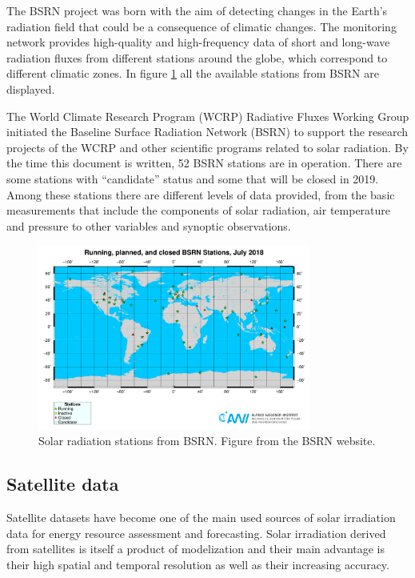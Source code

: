 
The BSRN project was born with the aim of detecting changes in the Earth's radiation field that could be a consequence of climatic changes. The monitoring network provides high-quality and high-frequency data of short and long-wave radiation fluxes from different stations around the globe, which correspond to different climatic zones. In figure \ref{fig:bsrnstations} all the available stations from BSRN are displayed.

The World Climate Research Program (WCRP) Radiative Fluxes Working Group initiated the Baseline Surface Radiation Network (BSRN) to support the research projects of the WCRP and other scientific programs related to solar radiation. By the time this document is written, 52 BSRN stations are in operation. There are some stations with ``candidate'' status and some that will be closed in 2019. Among these stations there are different levels of data provided, from the basic measurements that include the components of solar radiation, air temperature and pressure to other variables and synoptic observations.

\begin{figure}[h]
  \centering
  \includegraphics[width=0.8\textwidth]{DataMethodsFIGS/bsrn.pdf}
  \caption[Map of BSRN stations]{Solar radiation stations from BSRN. Figure from the BSRN website.}
 \label{fig:bsrnstations}
\end{figure}

\subsection{Satellite data}
 
Satellite datasets have become one of the main used sources of solar irradiation data for energy resource assessment and forecasting. Solar irradiation derived from satellites is itself a product of modelization and their main advantage is their high spatial and temporal resolution as well as their increasing accuracy. 

